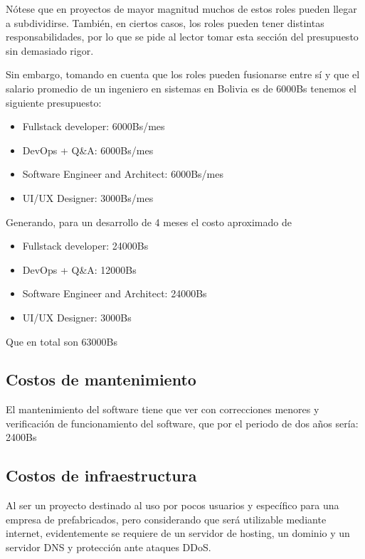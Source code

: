Nótese que en proyectos de mayor magnitud muchos de estos roles pueden llegar a subdividirse. También, en ciertos casos, los roles pueden tener distintas responsabilidades, por lo que se pide al lector tomar esta sección del presupuesto sin demasiado rigor.

Sin embargo, tomando en cuenta que los roles pueden fusionarse entre sí y que el salario promedio de un ingeniero en sistemas en Bolivia es de 6000Bs tenemos el siguiente presupuesto:

\begin{itemize}
  \item Fullstack developer: 6000Bs/mes
  \item DevOps + Q\&A: 6000Bs/mes
  \item Software Engineer and Architect: 6000Bs/mes
  \item UI/UX Designer: 3000Bs/mes
\end{itemize}

Generando, para un desarrollo de 4 meses el costo aproximado de 

\begin{itemize}
  \item Fullstack developer: 24000Bs
  \item DevOps + Q\&A: 12000Bs
  \item Software Engineer and Architect: 24000Bs
  \item UI/UX Designer: 3000Bs
\end{itemize}

Que en total son 63000Bs

\subsection{Costos de mantenimiento}

El mantenimiento del software tiene que ver con correcciones menores y verificación de funcionamiento del software, que por el periodo de dos años sería: 2400Bs

\subsection{Costos de infraestructura}

Al ser un proyecto destinado al uso por pocos usuarios y específico para una empresa de prefabricados, pero considerando que será utilizable mediante internet, evidentemente se requiere de un servidor de hosting, un dominio y un servidor DNS y protección ante ataques DDoS. 

